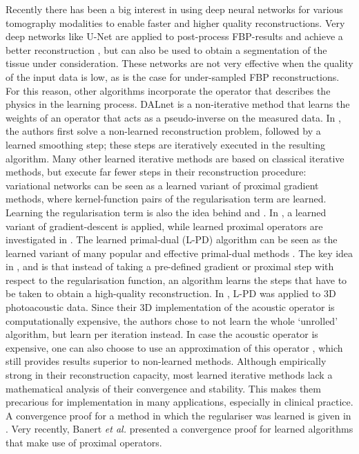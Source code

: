 \documentclass[journal]{IEEEtran}
\begin{document}
Recently there has been a big interest in using deep neural networks for various tomography modalities to enable faster and higher quality reconstructions. Very deep networks like U-Net \cite{Ronneberger2015} are applied to post-process FBP-results and achieve a better reconstruction \cite{Jin2017, Antholzer2017, Kofler2018, Waibel2018}, but can also be used to obtain a segmentation of the tissue under consideration. These networks are not very effective when the quality of the input data is low, as is the case for under-sampled FBP reconstructions. For this reason, other algorithms incorporate the operator that describes the physics in the learning process. DALnet \cite{Schwab2018} is a non-iterative method that learns the weights of an operator that acts as a pseudo-inverse on the measured data. In \cite{Kelly2017}, the authors first solve a non-learned reconstruction problem, followed by a learned smoothing step; these steps are iteratively executed in the resulting algorithm. Many other learned iterative methods are based on classical iterative methods, but execute far fewer steps in their reconstruction procedure: variational networks \cite{Kobler2017b, Hammernik2017f, Kobler2018, Hammernik2018} can be seen as a learned variant of proximal gradient methods, where kernel-function pairs of the regularisation term are learned. Learning the regularisation term is also the idea behind \cite{Chen2018} and \cite{Li2018}. In \cite{Adler2017a}, a learned variant of gradient-descent is applied, while learned proximal operators are investigated in \cite{Meinhardt2017}. The learned primal-dual (L-PD) algorithm \cite{Adler2018} can be seen as the learned variant of many popular and effective primal-dual methods \cite{Esser2010}. The key idea in \cite{Adler2017a}, \cite{Meinhardt2017} and \cite{Adler2018} is that instead of taking a pre-defined gradient or proximal step with respect to the regularisation function, an algorithm learns the steps that have to be taken to obtain a high-quality reconstruction. In \cite{Hauptmann2018}, L-PD was applied to 3D photoacoustic data. Since their 3D implementation of the acoustic operator is computationally expensive, the authors chose to not learn the whole `unrolled' algorithm, but learn per iteration instead. In case the acoustic operator is expensive, one can also choose to use an approximation of this operator \cite{Hauptmann2018b}, which still provides results superior to non-learned methods. Although empirically strong in their reconstruction capacity, most learned iterative methods lack a mathematical analysis of their convergence and stability. This makes them precarious for implementation in many applications, especially in clinical practice. A convergence proof for a method in which the regulariser was learned is given in \cite{Li2018}. Very recently, Banert \emph{et al.} \cite{Banert2018} presented a convergence proof for learned algorithms that make use of proximal operators.
\end{document}
